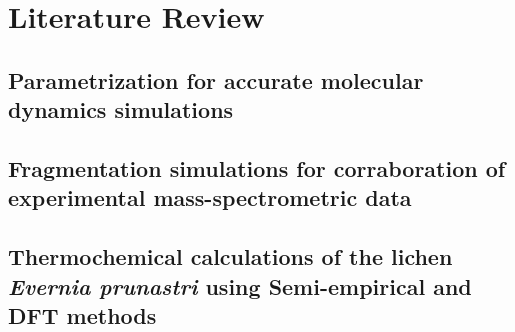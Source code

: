 \section{Literature Review}
\label{sec:lit_review}
\subsection{Parametrization for accurate molecular dynamics simulations}

\subsection{Fragmentation simulations for corraboration of experimental mass-spectrometric data}

\subsection{Thermochemical calculations of the lichen \textit{Evernia prunastri} using Semi-empirical and DFT methods}

